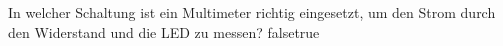     {In welcher Schaltung ist ein Multimeter richtig eingesetzt, um den Strom durch den Widerstand und die LED zu messen? }
    {}
    {}
    {}
    {}
    {false}{true}